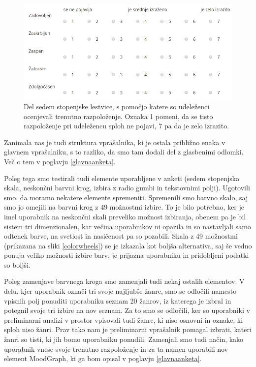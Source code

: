 \documentclass[a4paper, 12pt]{book}
\begin{document}
{\begin{figure}[ht]
\centering
\includegraphics[width=13cm]{images/likart.png}

\caption{Del sedem stopenjske lestvice, s pomočjo katere so udeleženci ocenjevali trenutno razpoloženje. Oznaka 1 pomeni, da se tisto razpoloženje pri udeležencu sploh ne pojavi, 7 pa da je zelo izrazito. }
\label{skala}
\end{figure}

Zanimala nas je tudi struktura vprašalnika, ki je ostala približno enaka v glavnem vprašalniku, s to razliko, da smo tam dodali del z glasbenimi odlomki. Več o tem v poglavju \ref{glavnaanketa}.

Poleg tega smo testirali tudi elemente uporabljene v anketi (sedem stopenjska skala, neskončni barvni krog, izbira z radio gumbi in tekstovnimi polji). Ugotovili smo, da moramo nekatere elemente spremeniti. Spremenili smo barvno skalo, saj smo jo omejili na barvni krog z 49 možnostmi izbire. To je bilo potrebno, ker je imel uporabnik na neskončni skali preveliko možnost izbiranja, obenem pa je bil sistem tri dimenzionalen, kar večina uporabnikov ni opazila in so nastavljali samo odtenek barve, na svetlost in nasičenost pa so pozabili. Skala z 49 možnostmi (prikazana na sliki \ref{colorwheels}) se je izkazala kot boljša alternativa, saj še vedno ponuja veliko možnosti izbire barv, je prijazna uporabniku in pridobljeni podatki so boljši.

Poleg zamenjave barvnega kroga smo zamenjali tudi nekaj ostalih elementov. V delu, kjer uporabnik označi tri svoje najljubše žanre, smo se odločili namesto vpisnih polj ponuditi uporabniku seznam 20 žanrov, iz katerega je izbral in potegnil svoje tri izbire na nov seznam.  Za to smo se odločili, ker so uporabniki v preliminarni analizi v prostor vpisovali tudi žanre, ki niso osnovni in oznake, ki sploh niso žanri. Prav tako nam je preliminarni vprašalnik pomagal izbrati, kateri žanri so tisti, ki jih bomo uporabniku ponudili. Zamenjali smo tudi način, kako uporabnik vnese svoje trenutno razpoloženje in za ta namen uporabili nov element MoodGraph, ki ga bom opisal v poglavju \ref{glavnaanketa}. 

}
\end{document}
